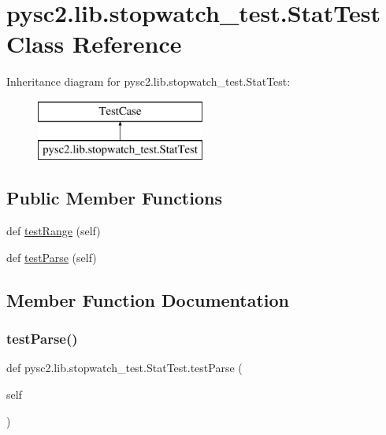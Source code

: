 \hypertarget{classpysc2_1_1lib_1_1stopwatch__test_1_1_stat_test}{}\section{pysc2.\+lib.\+stopwatch\+\_\+test.\+Stat\+Test Class Reference}
\label{classpysc2_1_1lib_1_1stopwatch__test_1_1_stat_test}
Inheritance diagram for pysc2.\+lib.\+stopwatch\+\_\+test.\+Stat\+Test\+:\begin{figure}[H]
\begin{center}
\leavevmode
\includegraphics[height=2.000000cm]{classpysc2_1_1lib_1_1stopwatch__test_1_1_stat_test}
\end{center}
\end{figure}
\subsection*{Public Member Functions}
\begin{DoxyCompactItemize}
\item 
def \mbox{\hyperlink{classpysc2_1_1lib_1_1stopwatch__test_1_1_stat_test_a08881b8c285f4b47606e1570888154ab}{test\+Range}} (self)
\item 
def \mbox{\hyperlink{classpysc2_1_1lib_1_1stopwatch__test_1_1_stat_test_a134279ac681d8a4d5c9d2e193e2c8f44}{test\+Parse}} (self)
\end{DoxyCompactItemize}


\subsection{Member Function Documentation}
\mbox{\label{classpysc2_1_1lib_1_1stopwatch__test_1_1_stat_test_a134279ac681d8a4d5c9d2e193e2c8f44}} 
\subsubsection{\texorpdfstring{test\+Parse()}{testParse()}}
{\footnotesize\ttfamily def pysc2.\+lib.\+stopwatch\+\_\+test.\+Stat\+Test.\+test\+Parse (\begin{DoxyParamCaption}\item[{}]{self }\end{DoxyParamCaption})}

